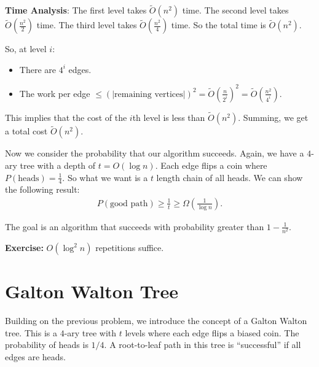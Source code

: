 \documentclass{report}
\begin{document}
\noindent \textbf{Time Analysis}: The first level takes $\tilde{O}(n^2)$ time. The second level takes $\tilde{O}\left(\frac{n^2}{2}\right)$ time. The third level takes $\tilde{O}\left(\frac{n^2}{4}\right)$ time. So the total time is $\tilde{O}(n^2)$. 

\noindent So, at level $i$:
\begin{itemize}
    \item There are $4^i$ edges.
    \item The work per edge $\leq (|\text{remaining vertices}|)^2 = \tilde{O}\left(\frac{n}{2^i}\right)^2 = \tilde{O}\left(\frac{n^2}{4^i}\right)$. 
\end{itemize}
This implies that the cost of the $i$th level is less than $\tilde O(n^2)$. Summing, we get a total cost $\tilde O(n^2)$.

Now we consider the probability that our algorithm succeeds. Again, we have a $4$-ary tree with a depth of $t = O(\log n)$. Each edge flips a coin where $P(\text{heads}) = \frac 14$. So what we want is a $t$ length chain of all heads. We can show the following result:
\begin{align*}
    P(\text{good path}) \geq \frac 1t \geq \Omega \left(\frac{1} {\log n}\right).
\end{align*}

The goal is an algorithm that succeeds with probability greater than $1 - \frac{1}{n^2}$. 

\noindent \textbf{Exercise:} $O(\log^2 n)$ repetitions suffice.

\section{Galton Walton Tree}
Building on the previous problem, we introduce the concept of a Galton Walton tree. This is a $4$-ary tree with $t$ levels where each edge flips a biased coin. The probability of heads is $1/4$. A root-to-leaf path in this tree is ``successful'' if all edges are heads.
\end{document}
